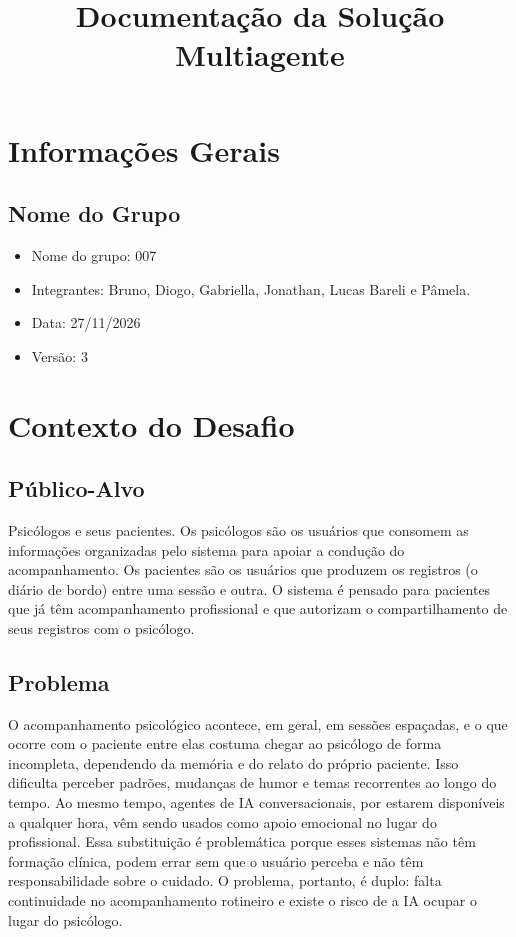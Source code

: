 \documentclass[12pt,a4paper]{article}
\title{\textbf{Documentação da Solução Multiagente}}
\author{}
\date{}
\begin{document}
\maketitle
\tableofcontents
\newpage

\section{Informações Gerais}

\subsection{Nome do Grupo}
\begin{itemize}
  \item Nome do grupo: 007
  \item Integrantes: Bruno, Diogo, Gabriella, Jonathan, Lucas Bareli e Pâmela.
  \item Data: 27/11/2026
  \item Versão: 3
\end{itemize}

\section{Contexto do Desafio}

\subsection{Público-Alvo}
Psicólogos e seus pacientes. Os psicólogos são os usuários que consomem as
informações organizadas pelo sistema para apoiar a condução do acompanhamento. Os pacientes
são os usuários que produzem os registros (o diário de bordo) entre uma sessão e outra. O
sistema é pensado para pacientes que já têm acompanhamento profissional e que autorizam
o compartilhamento de seus registros com o psicólogo.

\subsection{Problema}
O acompanhamento psicológico acontece, em geral, em sessões espaçadas, e o que ocorre com o paciente entre elas costuma chegar ao psicólogo de forma incompleta, dependendo da memória e do relato do próprio paciente. Isso dificulta perceber padrões, mudanças de humor e temas recorrentes ao longo do tempo.
Ao mesmo tempo, agentes de IA conversacionais, por estarem disponíveis a qualquer hora, vêm sendo usados como apoio emocional no lugar do profissional. Essa substituição é problemática porque esses sistemas não têm formação clínica, podem errar sem que o usuário perceba e não têm responsabilidade sobre o cuidado. O problema, portanto, é duplo: falta continuidade no acompanhamento rotineiro e existe o risco de a IA ocupar o lugar do psicólogo.
\end{document}
